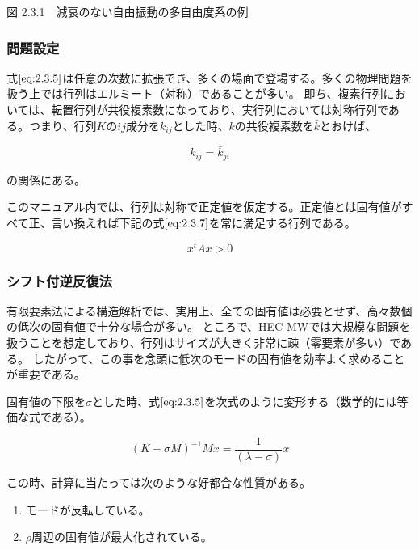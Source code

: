 \documentclass[a4paper,pandoc,ja=standard]{bxjsarticle}
\providecommand{\tightlist}{%
  \setlength{\itemsep}{0pt}\setlength{\parskip}{0pt}}
\begin{document}
図 2.3.1　減衰のない自由振動の多自由度系の例

\hypertarget{ux554fux984cux8a2dux5b9a}{%
\subsubsection{問題設定}\label{ux554fux984cux8a2dux5b9a}}

式\(\eqref{eq:2.3.5}\)は任意の次数に拡張でき、多くの場面で登場する。多くの物理問題を扱う上では行列はエルミート（対称）であることが多い。
即ち、複素行列においては、転置行列が共役複素数になっており、実行列においては対称行列である。つまり、行列\(K\)の\(ij\)成分を\(k_{ij}\)とした時、\(k\)の共役複素数を\(\bar{k}\)とおけば、

\begin{equation}
k_{ij} = \bar{k}_{ji}
\label{eq:2.3.6}
\end{equation}

の関係にある。

このマニュアル内では、行列は対称で正定値を仮定する。正定値とは固有値がすべて正、言い換えれば下記の式\(\eqref{eq:2.3.7}\)を常に満足する行列である。

\begin{equation}
x^{t} A x > 0
\label{eq:2.3.7}
\end{equation}

\hypertarget{ux30b7ux30d5ux30c8ux4ed8ux9006ux53cdux5fa9ux6cd5}{%
\subsubsection{シフト付逆反復法}\label{ux30b7ux30d5ux30c8ux4ed8ux9006ux53cdux5fa9ux6cd5}}

有限要素法による構造解析では、実用上、全ての固有値は必要とせず、高々数個の低次の固有値で十分な場合が多い。
ところで、HEC-MWでは大規模な問題を扱うことを想定しており、行列はサイズが大きく非常に疎（零要素が多い）である。
したがって、この事を念頭に低次のモードの固有値を効率よく求めることが重要である。

固有値の下限を\(\sigma\)とした時、式\(\eqref{eq:2.3.5}\)を次式のように変形する（数学的には等価な式である）。

\begin{equation}
(K - \sigma M)^{-1} M x = \frac{1}{(\lambda-\sigma)} x
\label{eq:2.3.8}
\end{equation}

この時、計算に当たっては次のような好都合な性質がある。

\begin{enumerate}
\def\labelenumi{\arabic{enumi}.}
\tightlist
\item
  モードが反転している。
\item
  \(\rho\)周辺の固有値が最大化されている。
\end{enumerate}
\end{document}
